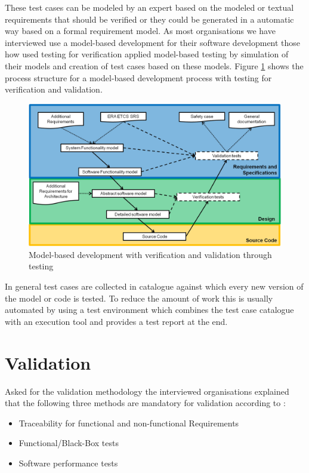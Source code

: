 \documentclass{./template/openetcs_report}
\begin{document}
These test cases can be modeled by an expert based on the modeled or textual requirements that should be verified or they could be generated in a automatic way based on a formal requirement model. As most organisations we have interviewed use a model-based development for their software development those how used testing for verification applied model-based testing by simulation of their models and creation of test cases based on these models. Figure \ref{fig: MBD-Testing} shows the process structure for a model-based development process with testing for verification and validation.

\begin{figure}[h]
\centering
\includegraphics[scale=0.6]{Lifecycle-Model-based-Approach-Testing.png}
\caption{Model-based development with verification and validation through testing}
\label{fig: MBD-Testing}
\end{figure}

In general test cases are collected in catalogue against which every new version of the model or code is tested. To reduce the amount of work this is usually automated by using a test environment which combines the test case catalogue with an execution tool and provides a test report at the end.

\section{Validation}

Asked for the validation methodology the interviewed organisations explained that the following three methods are mandatory for validation according to \citeauthor{EN50128:2011}:

\vspace{-10pt}
\begin{itemize}[topsep=2pt, partopsep=2pt,itemsep=2pt,parsep=2pt]
\item Traceability for functional and non-functional Requirements
\item Functional/Black-Box tests
\item Software performance tests
\end{itemize}
\end{document}
